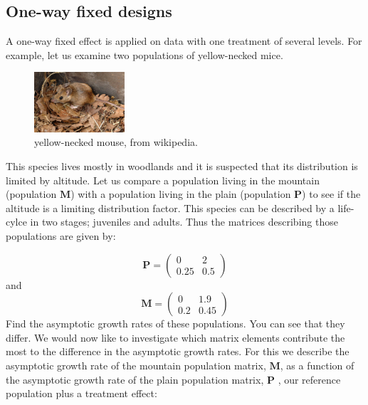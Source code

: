 \documentclass{article}\usepackage[]{graphicx}\usepackage[]{color}
\begin{document}
\subsection{One-way fixed designs}
A one-way fixed effect is applied on data with one treatment of several levels. For example, let us examine two populations of yellow-necked mice. 

\begin{figure}[h]
\centering
\includegraphics[width=0.3\textwidth]{mouse.jpg}
\caption{\label{fig:mice}yellow-necked mouse, from wikipedia.}
\end{figure}

This species lives mostly in woodlands and it is suspected that its distribution is limited by altitude. Let us compare a population living in the mountain (population $\boldsymbol{M}$) with a population living in the plain (population $\boldsymbol{P}$) to see if the altitude is a limiting distribution factor. This species can be described by a life-cylce in two stages; juveniles and adults. Thus the matrices describing those populations are given by:

\begin{equation}
\boldsymbol{P}=\begin{pmatrix}
0&2\\
0.25&0.5
\end{pmatrix}
\end{equation}
and
\begin{equation}
\boldsymbol{M}=\begin{pmatrix}
0&1.9\\
0.2&0.45
\end{pmatrix}
\end{equation}
Find the asymptotic growth rates of these populations. You can see that they differ. We would now like to investigate which matrix elements contribute the most to the difference in the asymptotic growth rates. For this we describe the asymptotic growth rate of the mountain population matrix, $\boldsymbol{M}$, as a function of the asymptotic growth rate of the plain population matrix, $\boldsymbol{P}$ , our reference population plus a treatment effect:  
\end{document}
